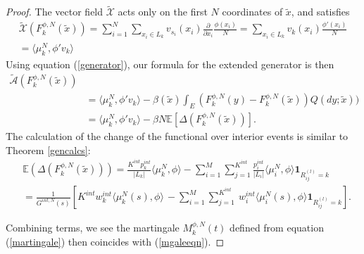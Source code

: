 \begin{proof}
The vector field $\tilde{\mathcal X}$ acts only on the first $N$ coordinates of $\tilde x$, and satisfies
\begin{eqnarray}
 \tilde{\mathcal X}(F_k^{\phi,N}(\tilde x)) = \sum_{i = 1}^{N} \sum_{x_i \in L_k}v_{s_i}(x_i)\frac{\partial}{\partial x_i}\frac{\phi(x_i)}{N} = \sum_{x_i \in L_k} v_k(x_i)\frac{\phi'(x_i)}{N} \\
 = \langle \mu_k^N, \phi' v_k \rangle \nonumber 
 \end{eqnarray}
Using equation (\ref{generator}), our formula for the extended generator is then
\begin{align}\label{genequa}
\tilde{\mathcal A}(F_k^{\phi, N}(\tilde x))&  \\ &=\langle \mu_k^N, \phi' v_k \rangle -\beta(\tilde x)\int_E (F_k^{\phi, N}(y)-F_k^{\phi, N }(\tilde x))Q(dy;\tilde x)) \nonumber\\
&= \langle \mu_k^N, \phi' v_k \rangle -\beta N \mathbb{E}\left[\Delta(F_k^{\phi, N}(\tilde x))\right].\nonumber 
\end{align}  
The calculation of the change of the functional over interior events is similar to Theorem \ref{gencalcs}:
\begin{align}\label{intfunct}
 &\mathbb{E}\left(\Delta(F_k^{\phi, N}(\tilde x))\right)=  \frac{K^{int}p^{int}_k }{|L_{k}|} \langle\mu_k^N,\phi\rangle-\sum_{i = 1}^{M}\sum_{j=1}^{K^{int}}  \frac{p^{int}_i }{|L_{i}|}\langle \mu_i^N,\phi\rangle\mathbf{1}_{R^{(l)}_{ij} = k}\\ 
&= \frac{1}{G^{int,N}(s)}\left[K^{int}w^{int}_k \langle \mu_k^N(s),\phi\rangle\frac{}{}-\sum_{i = 1}^{M}\sum_{j = 1}^{K^{int}}\  w^{int}_i \langle \mu_i^N(s),\phi\rangle\mathbf{1}_{R^{(l)}_{ij} = k}\right]. \nonumber 
\end{align}

Combining terms, we see the martingale $M_k^{\phi,N}(t)$ defined from equation (\ref{martingale}) then coincides with (\ref{mgaleeqn}).  
\end{proof}

